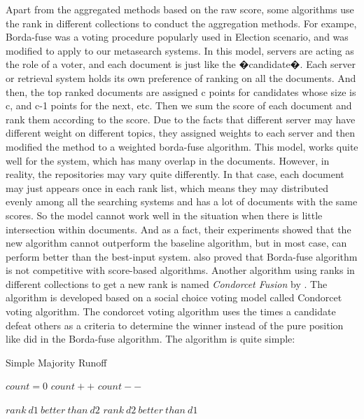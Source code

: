  Apart from the aggregated methods based on the raw score, some algorithms use the rank in different collections to conduct the aggregation methods. For exampe, Borda-fuse\cite{Aslam2001} was a voting procedure popularly used in Election scenario, and was modified to apply to our metasearch systems. In this model, servers are acting as the role of a voter, and each document is just like the �candidate�. Each server or retrieval system holds its own preference of ranking on all the documents. And then, the top ranked documents are assigned c points for candidates whose size is c, and c-1 points for the next, etc. Then we sum the score of each document and rank them according to the score. Due to the facts that different server may have different weight on different topics, they assigned weights to each server and then modified the method to a weighted borda-fuse algorithm. This model, works quite well for the system, which has many overlap in the documents. However, in reality, the repositories may vary quite differently. In that case, each document may just appears once in each rank list, which means they may distributed evenly among all the searching systems and has a lot of documents with the same scores. So the model cannot work well in the situation when there is little intersection within documents. And as a fact, their experiments showed that the new algorithm cannot outperform the baseline algorithm, but in most case, can perform better than the best-input system. \cite{Renda2003} also proved that Borda-fuse algorithm is not competitive with score-based algorithms. Another algorithm using ranks in different collections to get a new rank is named \textit{Condorcet Fusion} by \cite{Montague2002}. The algorithm is developed based on a social choice voting model called Condorcet voting algorithm. The condorcet voting algorithm uses the times a candidate defeat others as a criteria to determine the winner instead of the pure position like \cite{Aslam2001} did in the Borda-fuse algorithm. The algorithm is quite simple:

\begin{algorithm}
\caption{Simple Majority Runoff}
\label{ag:smr}
\begin{algorithmic}[1]
\State $count = 0$
		\State$count++$
	\EndIf
		\State$count--$
	\EndIf
\EndFor

\State$rank\ d1\ better\ than\ d2$
\Else
\State$rank\ d2\ better\ than\ d1$
\EndIf
\end{algorithmic}
\end{algorithm}

